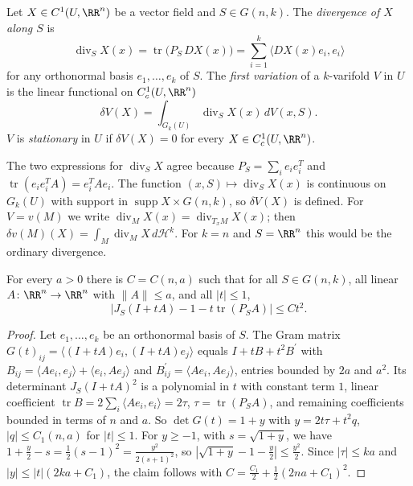 \begin{definition}\label{currents:definition-first-variation}
Let $X \in C^1(U, \RR^n)$ be a vector field and $S \in G(n, k)$. The \emph{divergence of $X$ along $S$} is
\[
\operatorname{div}_SX(x) = \operatorname{tr}\bigl(P_S\,DX(x)\bigr) = \sum_{i=1}^k\langle DX(x)e_i, e_i\rangle
\]
for any orthonormal basis $e_1, \ldots, e_k$ of $S$. The \emph{first variation} of a $k$-varifold $V$ in $U$ is the linear functional on $C^1_c(U, \RR^n)$
\[
\delta V(X) = \int_{G_k(U)}\operatorname{div}_SX(x)\,dV(x, S) .
\]
$V$ is \emph{stationary} in $U$ if $\delta V(X) = 0$ for every $X \in C^1_c(U, \RR^n)$.
\end{definition}

The two expressions for $\operatorname{div}_SX$ agree because $P_S = \sum_ie_ie_i^T$ and $\operatorname{tr}(e_ie_i^TA) = e_i^TAe_i$. The function $(x, S) \mapsto \operatorname{div}_SX(x)$ is continuous on
$G_k(U)$ with support in $\operatorname{supp}X \times G(n, k)$, so $\delta V(X)$ is defined. For $V = v(M)$ we write $\operatorname{div}_MX(x) = \operatorname{div}_{T_xM}X(x)$; then
$\delta v(M)(X) = \int_M\operatorname{div}_MX\,d\mathcal{H}^k$. For $k = n$ and $S = \RR^n$ this would be the ordinary divergence.

\begin{lemma}\label{currents:lemma-jacobian-expansion}
For every $a > 0$ there is $C = C(n, a)$ such that for all $S \in G(n, k)$, all linear $A \colon \RR^n \to \RR^n$ with $\|A\| \leq a$, and all $|t| \leq 1$,
\[
\bigl|J_S(I + tA) - 1 - t\operatorname{tr}(P_SA)\bigr| \leq Ct^2 .
\]
\end{lemma}

\begin{proof}
Let $e_1, \ldots, e_k$ be an orthonormal basis of $S$. The Gram matrix $G(t)_{ij} = \langle(I + tA)e_i, (I + tA)e_j\rangle$ equals $I + tB + t^2B^{\prime}$ with
$B_{ij} = \langle Ae_i, e_j\rangle + \langle e_i, Ae_j\rangle$ and $B^{\prime}_{ij} = \langle Ae_i, Ae_j\rangle$, entries bounded by $2a$ and $a^2$. Its determinant $J_S(I + tA)^2$ is a polynomial in $t$ with constant
term $1$, linear coefficient $\operatorname{tr}B = 2\sum_i\langle Ae_i, e_i\rangle = 2\tau$, $\tau = \operatorname{tr}(P_SA)$, and remaining coefficients bounded in terms of $n$ and $a$. So
$\det G(t) = 1 + y$ with $y = 2t\tau + t^2q$, $|q| \leq C_1(n, a)$ for $|t| \leq 1$. For $y \geq -1$, with $s = \sqrt{1 + y}$, we have $1 + \frac y2 - s = \frac12(s - 1)^2 = \frac{y^2}{2(s + 1)^2}$, so
$|\sqrt{1 + y} - 1 - \frac y2| \leq \frac{y^2}2$. Since $|\tau| \leq ka$ and $|y| \leq |t|(2ka + C_1)$, the claim follows with $C = \frac{C_1}2 + \frac12(2na + C_1)^2$.
\end{proof}

